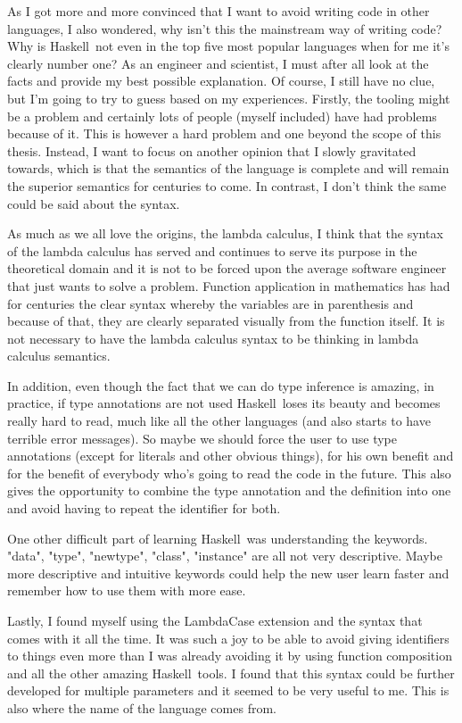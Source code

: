 \documentclass[diploma]{softlab-thesis}
\def\H{Haskell}
\begin{document}
As I got more and more convinced that I want to avoid writing code in other
languages, I also wondered, why isn't this the mainstream way of writing code?
Why is \H\ not even in the top five most popular languages when for me it's
clearly number one? As an engineer and scientist, I must after all look at the
facts and provide my best possible explanation. Of course, I still have no
clue, but I'm going to try to guess based on my experiences.  Firstly, the
tooling might be a problem and certainly lots of people (myself included) have
had problems because of it. This is however a hard problem and one beyond the
scope of this thesis.  Instead, I want to focus on another opinion that I
slowly gravitated towards, which is that the semantics of the language is
complete and will remain the superior semantics for centuries to come.  In
contrast, I don't think the same could be said about the syntax.

As much as we all love the origins, the lambda
calculus, I think that the syntax of the lambda calculus has served and
continues to serve its purpose in the theoretical domain and it is not to be
forced upon the average software engineer that just wants to solve a problem.
Function application in mathematics has had for centuries the clear syntax
whereby the variables are in parenthesis and because of that, they are clearly
separated visually from the function itself. It is not necessary to have the
lambda calculus syntax to be thinking in lambda calculus semantics.

In addition, even though the fact that we can do type inference is amazing, in
practice, if type annotations are not used \H\ loses its beauty and
becomes really hard to read, much like all the other languages (and also starts
to have terrible error messages).  So maybe we should force the user to use
type annotations (except for literals and other obvious things), for his own
benefit and for the benefit of everybody who's going to read the code in the
future.  This also gives the opportunity to combine the type annotation and the
definition into one and avoid having to repeat the identifier for both.

One other difficult part of learning \H\ was understanding the keywords.
"data", "type", "newtype", "class", "instance" are all not very descriptive.
Maybe more descriptive and intuitive keywords could help the new user learn
faster and remember how to use them with more ease.

Lastly, I found myself using the LambdaCase extension and the syntax that comes
with it all the time. It was such a joy to be able to avoid giving identifiers
to things even more than I was already avoiding it by using function
composition and all the other amazing \H\ tools. I found that this syntax
could be further developed for multiple parameters and it seemed to be very
useful to me. This is also where the name of the language comes from.
\end{document}
